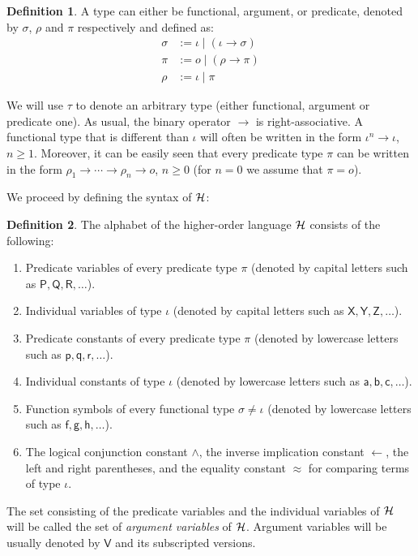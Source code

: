 \documentclass[submission,copyright]{eptcs}
\theoremstyle{definition}
\newtheorem{definition}{Definition}
\begin{document}
\begin{definition}
A type can either be functional, argument, or predicate, denoted by $\sigma$, $\rho$
and $\pi$ respectively and defined as:
\begin{align*}
\sigma & := \iota \mid (\iota \rightarrow \sigma) \\
\pi & := o \mid (\rho \rightarrow \pi) \\
\rho & := \iota \mid \pi
\end{align*}
\end{definition}

We will use $\tau$ to denote an arbitrary type (either functional, argument or predicate one).
As usual, the binary operator $\rightarrow$ is right-associative. A
functional type that is different than $\iota$ will often be written
in the form $\iota^n \rightarrow \iota$, $n\geq 1$. Moreover, it can
be easily seen that every predicate type $\pi$ can be written in the
form $\rho_1 \rightarrow \cdots \rightarrow \rho_n \rightarrow o$,
$n\geq 0$ (for $n=0$ we assume that $\pi=o$).

We proceed by defining the syntax of ${\cal H}$:
\begin{definition}
The alphabet of the higher-order language ${\cal H}$ consists of the following:
\begin{enumerate}
  \item Predicate variables of every predicate type $\pi$ (denoted by capital letters such as
      $\mathsf{P,Q,R,\ldots}$).
  \item Individual variables of type $\iota$ (denoted by capital letters such as
      $\mathsf{X,Y,Z,\ldots}$).
  \item Predicate constants of every predicate type $\pi$ (denoted by lowercase letters such as
      $\mathsf{p,q,r,\ldots}$).
  \item Individual constants of type $\iota$ (denoted by lowercase
      letters such as $\mathsf{a,b,c,\ldots}$).
  \item Function symbols of every functional type $\sigma \neq \iota$ (denoted by lowercase letters such as $\mathsf{f,g,h,\ldots}$).
  \item The logical conjunction constant $\wedge$, the inverse implication constant $\leftarrow$, the left and right parentheses,
        and the equality constant $\approx$ for comparing terms of type $\iota$.
\end{enumerate}
\end{definition}
The set consisting of the predicate variables and the individual variables of ${\cal H}$
will be called the set of {\em argument variables} of ${\cal H}$. Argument variables will
be usually denoted by $\mathsf{V}$ and its subscripted versions.
\end{document}
